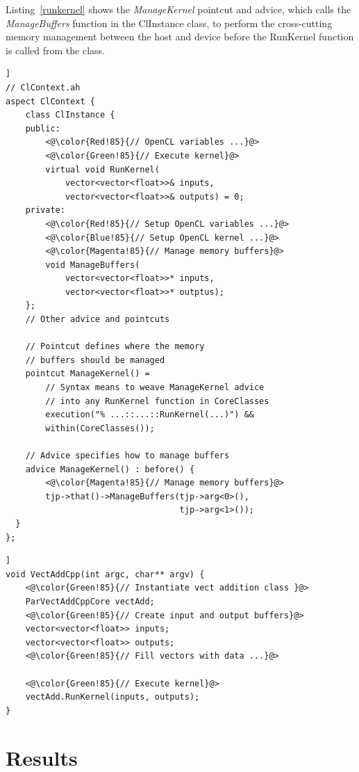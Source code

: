 \documentclass{sig-alternate-05-2015}
\begin{document}
Listing~\ref{runkernel} shows the \textit{ManageKernel} pointcut and advice,
which calls the \textit{ManageBuffers} function in the ClInstance
class, to perform the cross-cutting memory management between the host and
device before the RunKernel function is called from the \CPP
class.

\begin{lstlisting}[caption=Abstract aspect components which hide kernel
cross-cutting concerns.,label=runkernel,float=[!t]]
// ClContext.ah
aspect ClContext {
	class ClInstance {
	public:
		<@\color{Red!85}{// OpenCL variables ...}@>
		<@\color{Green!85}{// Execute kernel}@>
		virtual void RunKernel(
			vector<vector<float>>& inputs,
			vector<vector<float>>& outputs) = 0;
	private:
		<@\color{Red!85}{// Setup OpenCL variables ...}@>
		<@\color{Blue!85}{// Setup OpenCL kernel ...}@>
		<@\color{Magenta!85}{// Manage memory buffers}@>
		void ManageBuffers(
			vector<vector<float>>* inputs,
			vector<vector<float>>* outptus);
	};
	// Other advice and pointcuts 

	// Pointcut defines where the memory 
	// buffers should be managed
	pointcut ManageKernel() = 
		// Syntax means to weave ManageKernel advice 
		// into any RunKernel function in CoreClasses 
		execution("% ...::...::RunKernel(...)") &&
		within(CoreClasses());

	// Advice specifies how to manage buffers
	advice ManageKernel() : before() {
		<@\color{Magenta!85}{// Manage memory buffers}@>
		tjp->that()->ManageBuffers(tjp->arg<0>(),
								   tjp->arg<1>());
  }
};
\end{lstlisting}

\begin{lstlisting}[caption=Execution of a parallel kernel from a \CPP class.,label=crunkernel,float=[!t]]
void VectAddCpp(int argc, char** argv) {
	<@\color{Green!85}{// Instantiate vect addition class }@>
	ParVectAddCppCore vectAdd;
	<@\color{Green!85}{// Create input and output buffers}@>
	vector<vector<float>> inputs;
	vector<vector<float>> outputs;
	<@\color{Green!85}{// Fill vectors with data ...}@>
  
	<@\color{Green!85}{// Execute kernel}@>
	vectAdd.RunKernel(inputs, outputs);
}
\end{lstlisting}

\section{Results}\label{sec:results}
\end{document}
